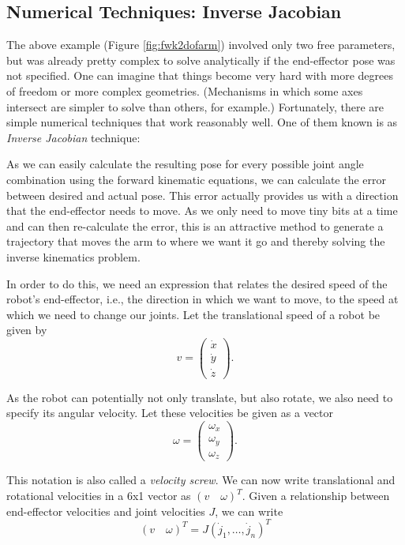 \subsection{Numerical Techniques: Inverse Jacobian}
The above example (Figure \ref{fig:fwk2dofarm}) involved only two free parameters, but was already pretty complex to solve analytically if the end-effector pose was not specified. One can imagine that things become very hard with more degrees of freedom or more complex geometries. (Mechanisms in which some axes intersect are simpler to solve than others, for example.) Fortunately, there are simple numerical techniques that work reasonably well. One of them known is as \emph{Inverse Jacobian} technique:

As we can easily calculate the resulting pose for every possible joint angle combination using the forward kinematic equations, we can calculate the error between desired and actual pose. This error actually provides us with a direction that the end-effector needs to move. As we only need to move tiny bits at a time and can then re-calculate the error, this is an attractive method to generate a trajectory that moves the arm to where we want it go and thereby solving the inverse kinematics problem.

In order to do this, we need an expression that relates the desired speed of the robot's end-effector, i.e., the direction in which we want to move, to the speed at which we need to change our joints. Let the translational speed of a robot be given by 
\begin{equation}
v=\left(\begin{array}{c}
\dot{x}\\
\dot{y}\\
\dot{z}
\end{array}
\right).
\end{equation}

 As the robot can potentially not only translate, but also rotate, we also need to specify its angular velocity. Let these velocities be given as a vector 
\begin{equation}
\omega=\left(\begin{array}{c}
\omega_x\\
\omega_y\\
\omega_z
\end{array}
\right).
\end{equation}

This notation is also called a \emph{velocity screw}. %
We can now write translational and rotational velocities in a 6x1 vector as $ (v \quad \omega)^T$. Given a relationship between end-effector velocities and joint velocities $J$, we can write
\begin{equation}
 (v \quad \omega)^T=J(\dot{j}_1,\ldots,\dot{j}_n)^T
\end{equation}

